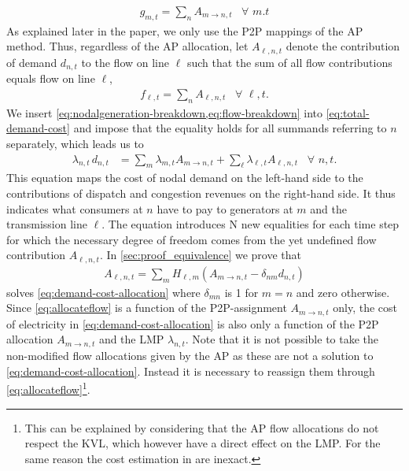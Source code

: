 \documentclass[11pt,twocolumn]{article}
\newcommand{\Forall}[1]{\hspace{10pt} \forall \,\, #1 }
\newcommand{\nodalgeneration}[1][n]{g_{#1,t}}
\newcommand{\flow}{f_{\ell,t}}
\newcommand{\lmp}[1][n]{\lambda_{#1,t}}
\newcommand{\demand}[1][n]{d_{#1,t}}
\newcommand{\ptdf}[1][n]{H_{\ell,#1}}
\newcommand{\allocatepeer}[1][m \rightarrow n]{A_{#1,t}}
\newcommand{\allocateflow}[1][n]{A_{\ell,#1,t}}
\begin{document}
\begin{align}
    \nodalgeneration[m] = \sum_n \allocatepeer \Forall{m.t} 
    \label{eq:nodalgeneration-breakdown}
\end{align}   
As explained later in the paper, we only use the \ac{P2P} mappings of the \ac{AP} method. Thus, regardless of the \ac{AP} allocation, let $\allocateflow$ denote the contribution of demand $\demand$ to the flow on line $\ell$ such that the sum of all flow contributions equals flow on line $\ell$,  
\begin{align}
    \flow = \sum_n \allocateflow \Forall{\ell,t}.
    \label{eq:flow-breakdown}
\end{align}
We insert \cref{eq:nodalgeneration-breakdown,eq:flow-breakdown} into \cref{eq:total-demand-cost} and impose that the equality holds for all summands referring to $n$ separately, which leads us to 
\begin{align}
    \lmp\, \demand &= \sum_m \lmp[m] \allocatepeer + \sum_\ell \lmp[\ell] \allocateflow \Forall{n,t}.
    \label{eq:demand-cost-allocation}
\end{align}
This equation maps the cost of nodal demand on the left-hand side to the contributions of dispatch and congestion revenues on the right-hand side. It thus indicates what consumers at $n$ have to pay to generators at $m$ and the transmission line $\ell$. The equation introduces N new equalities for each time step for which the necessary degree of freedom comes from the yet undefined flow contribution $\allocateflow$. In \cref{sec:proof_equivalence} we prove that 
\begin{align}
    \allocateflow = \sum_m \ptdf[m] (\allocatepeer - \delta_{nm} \demand) 
    \label{eq:allocateflow}
\end{align}
solves \cref{eq:demand-cost-allocation} where $\delta_{mn}$ is 1 for $m=n$ and zero otherwise. Since \cref{eq:allocateflow} is a function of the \ac{P2P}-assignment $\allocatepeer$ only, the cost of electricity in \cref{eq:demand-cost-allocation} is also only a function of the \ac{P2P} allocation $\allocatepeer$ and the \ac{LMP} $\lmp$. 
Note that it is not possible to take the non-modified flow allocations given by the \ac{AP} as these are not a solution to \cref{eq:demand-cost-allocation}. Instead it is necessary to reassign them through \cref{eq:allocateflow}\footnote{This can be explained by considering that the \ac{AP} flow allocations do not respect the \ac{KVL}, which however have a direct effect on the \ac{LMP}. For the same reason the cost estimation in \cite{meng_investigation_2007} are inexact.}. 
\end{document}

